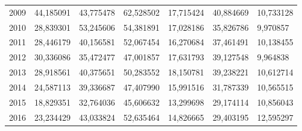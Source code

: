 \begin{table}
\begin{tabular}{p{1cm}p{2cm}p{2cm}p{2cm}p{2cm}p{2cm}p{2cm}}
 2009 &                44,185091 &            43,775478 &                                62,528502 &                        17,715424 &                                   40,884669 &                           10,733128 \\
 2010 &                28,839301 &            53,245606 &                                54,381891 &                        17,028186 &                                   35,826786 &                            9,970857 \\
 2011 &                28,446179 &            40,156581 &                                52,067454 &                        16,270684 &                                   37,461491 &                           10,138455 \\
 2012 &                30,336086 &            35,472477 &                                47,001857 &                        17,631793 &                                   39,127548 &                            9,964838 \\
 2013 &                28,918561 &            40,375651 &                                50,283552 &                        18,150781 &                                   39,238221 &                           10,612714 \\
 2014 &                24,587113 &            39,336687 &                                47,407990 &                        15,991516 &                                   31,787339 &                           10,565515 \\
 2015 &                18,829351 &            32,764036 &                                45,606632 &                        13,299698 &                                   29,174114 &                           10,856043 \\
 2016 &                23,234429 &            43,033824 &                                52,635464 &                        14,826665 &                                   29,403195 &                           12,595297 \\
\bottomrule
\end{tabular}
\end{table}
